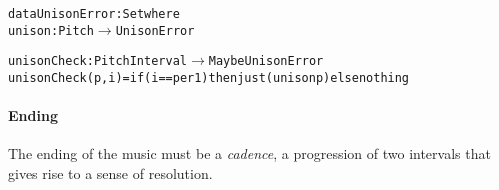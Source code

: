 \begin{alltt}
data UnisonError : Set where
  unison : Pitch \(\rightarrow\) UnisonError

unisonCheck : PitchInterval \(\rightarrow\) Maybe UnisonError
unisonCheck (p , i) = if (i == per1) then just (unison p) else nothing  
\end{alltt}

\paragraph{Ending}
The ending of the music must be a \emph{cadence}, a progression
of two intervals that gives rise to a sense of resolution.